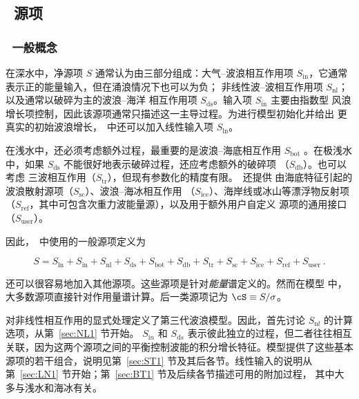 \vssub
\subsection{~源项}
\vsssub
\subsubsection{~一般概念}
\vsssub

在深水中，净源项 $S$ 通常认为由三部分组成：大气--波浪相互作用项
$S_{\mathrm{in}}$，它通常表示正的能量输入，但在涌浪情况下也可以为负；
非线性波--波相互作用项 $S_{\mathrm{nl}}$；以及通常以破碎为主的波浪--海洋
相互作用项 $S_{\mathrm{ds}}$。输入项 $S_{\mathrm{in}}$ 主要由指数型
风浪增长项控制，因此该源项通常只描述这一主导过程。为进行模型初始化并给出
更真实的初始波浪增长，\ws\ 中还可以加入线性输入项 $S_{\mathrm{ln}}$。

在浅水中，还必须考虑额外过程，最重要的是波浪--海底相互作用
$S_{\mathrm{bot}}$ \cite[例如][]{pro:Sea78}。在极浅水中，如果
$S_{\mathrm{ds}}$ 不能很好地表示破碎过程，还应考虑额外的破碎项
（$S_{\mathrm{db}}$）\citep[见][]{Filipot&Ardhuin2012}。也可以考虑
三波相互作用（$S_{\mathrm{tr}}$），但现有参数化的精度有限。\ws\ 还提供
由海底特征引起的波浪散射源项（$S_{\mathrm{sc}}$）、波浪--海冰相互作用
（$S_{\mathrm{ice}}$）、海岸线或冰山等漂浮物反射项
（$S_{\mathrm{ref}}$，其中可包含次重力波能量源），以及用于额外用户自定义
源项的通用接口（$S_{\mathrm{user}}$）。

因此，\ws\ 中使用的一般源项定义为


\begin{equation}
S = S_{\mathrm{ln}} + S_{\mathrm{in}} + S_{\mathrm{nl}} + S_{\mathrm{ds}} + S_{\mathrm{bot}} + S_{\mathrm{db}} 
    + S_{\mathrm{tr}} +
    S_{\mathrm{sc}} + S_{\mathrm{ice}} + S_{\mathrm{ref}} + S_{\mathrm{user}}\: .
\label{eq:general_st}
\end{equation}

\noindent
还可以很容易地加入其他源项。这些源项是针对{\em 能量}谱定义的。然而在模型
中，大多数源项直接针对作用量谱计算。后一类源项记为
$\cS \equiv S/\sigma$。

对非线性相互作用的显式处理定义了第三代波浪模型。因此，首先讨论
$S_{\mathrm  nl}$ 的计算选项，从第~\ref{sec:NL1} 节开始。
$S_{\mathrm  in}$ 和 $S_{\mathrm ds}$ 表示彼此独立的过程，但二者往往相互
关联，因为这两个源项之间的平衡控制波能的积分增长特征。模型提供了这些基本
源项的若干组合，说明见第~\ref{sec:ST1} 节及其后各节。线性输入的说明从
第~\ref{sec:LN1} 节开始；第~\ref{sec:BT1} 节及后续各节描述可用的附加过程，
其中大多与浅水和海冰有关。

